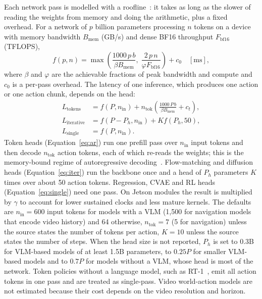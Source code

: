 \documentclass[applsci,review,submit,pdftex,oneauthor]{Definitions/mdpi}
\begin{document}
Each network pass is modelled with a roofline~\cite{williams2009roofline}: it takes as long as the slower of reading the weights from memory and doing the arithmetic, plus a fixed overhead. For a network of $p$ billion parameters processing $n$ tokens on a device with memory bandwidth $B_\text{mem}$ (GB/s) and dense BF16 throughput $F_\text{bf16}$ (TFLOPS),
\begin{equation}
f(p, n) = \max\!\left(\frac{1000\,p\,b}{\beta B_\text{mem}},\; \frac{2\,p\,n}{\varphi F_\text{bf16}}\right) + c_0 \quad [\text{ms}], \label{eq:pass}
\end{equation}
where $\beta$ and $\varphi$ are the achievable fractions of peak bandwidth and compute and $c_0$ is a per-pass overhead. The latency of one inference, which produces one action or one action chunk, depends on the head:
\begin{align}
L_\text{tokens} &= f(P, n_\text{in}) + n_\text{tok}\left(\frac{1000\,P\,b}{\beta B_\text{mem}} + c_t\right), \label{eq:ar}\\
L_\text{iterative} &= f(P - P_h, n_\text{in}) + K f(P_h, 50), \label{eq:iter}\\
L_\text{single} &= f(P, n_\text{in}). \label{eq:single}
\end{align}
Token heads (Equation~\eqref{eq:ar}) run one prefill pass over $n_\text{in}$ input tokens and then decode $n_\text{tok}$ action tokens, each of which re-reads the weights; this is the memory-bound regime of autoregressive decoding~\cite{pope2023inference}. Flow-matching and diffusion heads (Equation~\eqref{eq:iter}) run the backbone once and a head of $P_h$ parameters $K$ times over about 50 action tokens. Regression, CVAE and RL heads (Equation~\eqref{eq:single}) need one pass. On Jetson modules the result is multiplied by $\gamma$ to account for lower sustained clocks and less mature kernels. The defaults are $n_\text{in}=600$ input tokens for models with a VLM (1,500 for navigation models that encode video history) and 64 otherwise, $n_\text{tok}=7$ (5 for navigation) unless the source states the number of tokens per action, $K=10$ unless the source states the number of steps. When the head size is not reported, $P_h$ is set to 0.3B for VLM-based models of at least 1.5B parameters, to $0.25P$ for smaller VLM-based models and to $0.7P$ for models without a VLM, whose head is most of the network. Token policies without a language model, such as RT-1~\cite{ax221206817}, emit all action tokens in one pass and are treated as single-pass. Video world-action models are not estimated because their cost depends on the video resolution and horizon.
\end{document}
